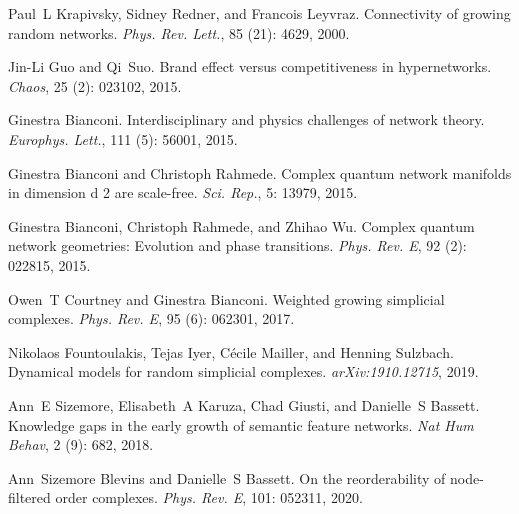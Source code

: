 Paul~L Krapivsky, Sidney Redner, and Francois Leyvraz.
\newblock Connectivity of growing random networks.
\newblock \emph{Phys. Rev. Lett.}, 85 (21): 4629, 2000.

Jin-Li Guo and Qi~Suo.
\newblock Brand effect versus competitiveness in hypernetworks.
\newblock \emph{Chaos}, 25 (2): 023102, 2015.

Ginestra Bianconi.
\newblock Interdisciplinary and physics challenges of network theory.
\newblock \emph{Europhys. Lett.}, 111 (5): 56001, 2015.

Ginestra Bianconi and Christoph Rahmede.
\newblock Complex quantum network manifolds in dimension d 2
are scale-free.
\newblock \emph{Sci. Rep.}, 5: 13979, 2015.

Ginestra Bianconi, Christoph Rahmede, and Zhihao Wu.
\newblock Complex quantum network geometries: {{Evolution}} and phase
transitions.
\newblock \emph{Phys. Rev. E}, 92 (2): 022815, 2015.

Owen~T Courtney and Ginestra Bianconi.
\newblock Weighted growing simplicial complexes.
\newblock \emph{Phys. Rev. E}, 95 (6): 062301, 2017.

Nikolaos Fountoulakis, Tejas Iyer, C{\'e}cile Mailler, and Henning Sulzbach.
\newblock Dynamical models for random simplicial complexes.
\newblock \emph{arXiv:1910.12715}, 2019.

Ann~E Sizemore, Elisabeth~A Karuza, Chad Giusti, and Danielle~S Bassett.
\newblock Knowledge gaps in the early growth of semantic feature networks.
\newblock \emph{Nat Hum Behav}, 2 (9): 682,
2018{}.

Ann~Sizemore Blevins and Danielle~S Bassett.
\newblock On the reorderability of node-filtered order complexes.
\newblock \emph{Phys. Rev. E}, 101: 052311, 2020.

